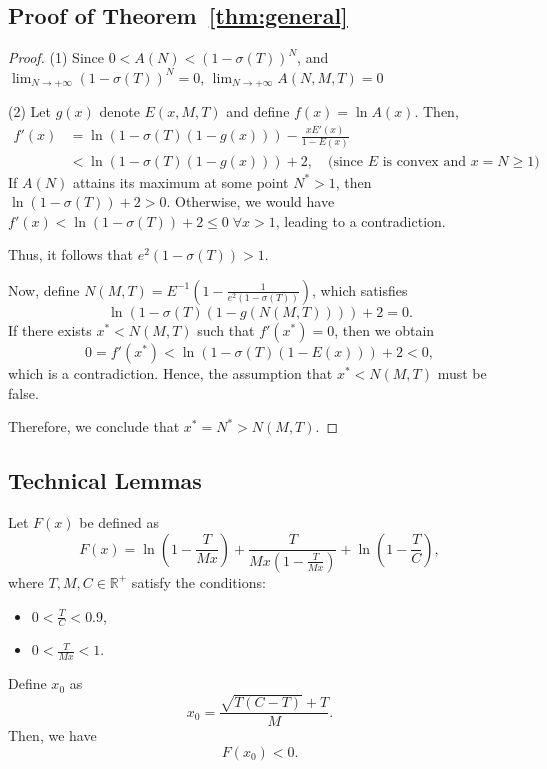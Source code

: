 \subsection{Proof of Theorem~\ref{thm:general}}
\general*

\begin{proof}
    (1) Since $0<A(N)<(1-\sigma(T))^N$, and $\lim_{N\rightarrow +\infty} (1-\sigma(T))^N = 0$, $\lim_{N\rightarrow +\infty} A(N,M,T) = 0$

    (2) Let $g(x)$ denote $E(x,M,T)$ and define $f(x) = \ln A(x)$. Then,  
\begin{align}
    f'(x) 
    &= \ln (1-\sigma(T)(1-g(x)))  - \frac{xE'(x)}{1-E(x)}\\
    &< \ln (1-\sigma(T)(1-g(x)))  + 2, \quad \text{(since $E$ is convex and $x = N \geq 1$)}
\end{align}
If $A(N)$ attains its maximum at some point $N^*>1$, then $\ln (1-\sigma(T))  + 2 > 0$. Otherwise, we would have $f'(x)<\ln (1-\sigma(T))  + 2 \leq 0 \;\forall x>1$, leading to a contradiction. 

Thus, it follows that $e^2(1-\sigma(T))>1$. 

Now, define $N(M,T) = E^{-1}\left(1-\frac{1}{e^2(1-\sigma(T))}\right)$, which satisfies  
\[
\ln (1-\sigma(T)(1-g(N(M,T))))  + 2 = 0.
\]
If there exists $x^*<N(M,T)$ such that $f'(x^*) = 0$, then we obtain  
\[
0 = f'(x^*)< \ln (1-\sigma(T)(1-E(x)))  + 2<0,
\]
which is a contradiction. Hence, the assumption that $x^*<N(M,T)$ must be false. 

Therefore, we conclude that $x^* = N^* > N(M,T)$.

\end{proof}

\subsection{Technical Lemmas}
\begin{lemma}
\label{lm:test_point}
    Let \( F(x) \) be defined as  
    \[
    F(x) = \ln\left(1 - \frac{T}{Mx}\right) + \frac{T}{Mx\left(1 - \frac{T}{Mx}\right)} + \ln\left(1 - \frac{T}{C}\right),
    \]
    where \( T, M, C \in \mathbb{R}^+ \) satisfy the conditions:
    \begin{itemize}
        \item \( 0 < \frac{T}{C} < 0.9 \),
        \item \( 0 < \frac{T}{Mx} < 1 \).
    \end{itemize}
    
    Define \( x_0 \) as
    \[
    x_0 = \frac{\sqrt{T(C-T)}+T}{M}.
    \]
    Then, we have
    \[
    F(x_0) < 0.
    \]
\end{lemma}

